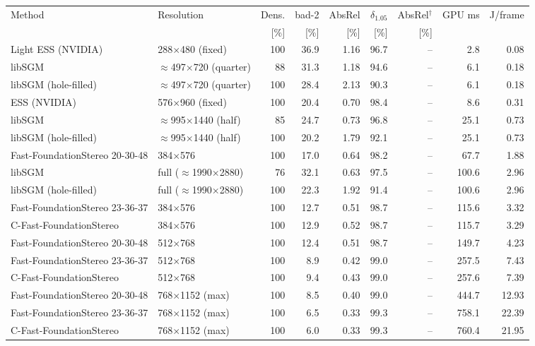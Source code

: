 \begin{tabular}{llrrrrrrr}
\toprule
Method & Resolution & Dens. & bad-2 & AbsRel & $\delta_{1.05}$ & AbsRel$^{\dagger}$ & GPU ms & J/frame \\
 & & [\%] & [\%] & [\%] & [\%] & [\%] & & \\
\midrule
Light ESS (NVIDIA) & 288$\times$480 (fixed) & 100 & 36.9 & 1.16 & 96.7 & -- & 2.8 & 0.08 \\
libSGM & $\approx$497$\times$720 (quarter) & 88 & 31.3 & 1.18 & 94.6 & -- & 6.1 & 0.18 \\
libSGM (hole-filled) & $\approx$497$\times$720 (quarter) & 100 & 28.4 & 2.13 & 90.3 & -- & 6.1 & 0.18 \\
ESS (NVIDIA) & 576$\times$960 (fixed) & 100 & 20.4 & 0.70 & 98.4 & -- & 8.6 & 0.31 \\
libSGM & $\approx$995$\times$1440 (half) & 85 & 24.7 & 0.73 & 96.8 & -- & 25.1 & 0.73 \\
libSGM (hole-filled) & $\approx$995$\times$1440 (half) & 100 & 20.2 & 1.79 & 92.1 & -- & 25.1 & 0.73 \\
Fast-FoundationStereo 20-30-48 & 384$\times$576 & 100 & 17.0 & 0.64 & 98.2 & -- & 67.7 & 1.88 \\
libSGM & full ($\approx$1990$\times$2880) & 76 & 32.1 & 0.63 & 97.5 & -- & 100.6 & 2.96 \\
libSGM (hole-filled) & full ($\approx$1990$\times$2880) & 100 & 22.3 & 1.92 & 91.4 & -- & 100.6 & 2.96 \\
Fast-FoundationStereo 23-36-37 & 384$\times$576 & 100 & 12.7 & 0.51 & 98.7 & -- & 115.6 & 3.32 \\
C-Fast-FoundationStereo & 384$\times$576 & 100 & 12.9 & 0.52 & 98.7 & -- & 115.7 & 3.29 \\
Fast-FoundationStereo 20-30-48 & 512$\times$768 & 100 & 12.4 & 0.51 & 98.7 & -- & 149.7 & 4.23 \\
Fast-FoundationStereo 23-36-37 & 512$\times$768 & 100 & 8.9 & 0.42 & 99.0 & -- & 257.5 & 7.43 \\
C-Fast-FoundationStereo & 512$\times$768 & 100 & 9.4 & 0.43 & 99.0 & -- & 257.6 & 7.39 \\
Fast-FoundationStereo 20-30-48 & 768$\times$1152 (max) & 100 & 8.5 & 0.40 & 99.0 & -- & 444.7 & 12.93 \\
Fast-FoundationStereo 23-36-37 & 768$\times$1152 (max) & 100 & 6.5 & 0.33 & 99.3 & -- & 758.1 & 22.39 \\
C-Fast-FoundationStereo & 768$\times$1152 (max) & 100 & 6.0 & 0.33 & 99.3 & -- & 760.4 & 21.95 \\

\end{tabular}
